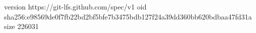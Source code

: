 version https://git-lfs.github.com/spec/v1
oid sha256:e98569de0f7fb22bd2bf5bfe7b3475bdb127f24a39dd360bb620bdbaa47fd31a
size 226031
